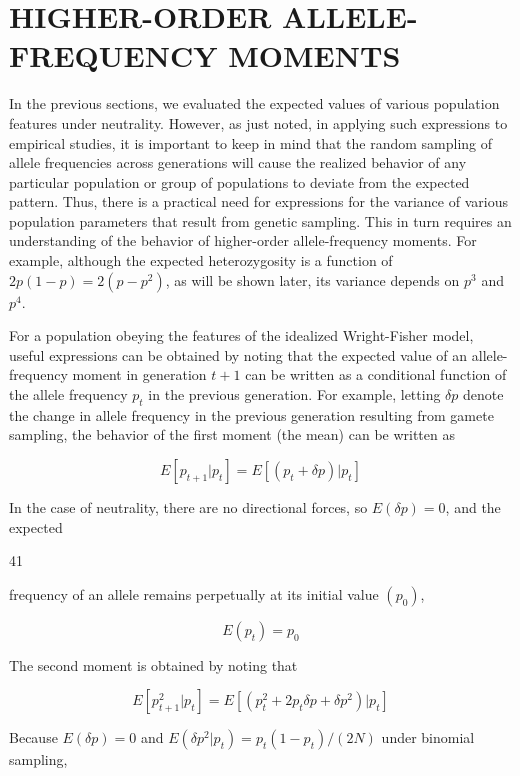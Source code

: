 \documentclass{article}
\begin{document}
\section{HIGHER-ORDER ALLELE-FREQUENCY MOMENTS}
In the previous sections, we evaluated the expected values of various population features under neutrality. However, as just noted, in applying such expressions to empirical studies, it is important to keep in mind that the random sampling of allele frequencies across generations will cause the realized behavior of any particular population or group of populations to deviate from the expected pattern. Thus, there is a practical need for expressions for the variance of various population parameters that result from genetic sampling. This in turn requires an understanding of the behavior of higher-order allele-frequency moments. For example, although the expected heterozygosity is a function of  $ 2p(1-p) = 2(p-p^2) $, as will be shown later, its variance depends on  $ p^3 $ and  $ p^4 $.

For a population obeying the features of the idealized Wright-Fisher model, useful expressions can be obtained by noting that the expected value of an allele-frequency moment in generation  $ t + 1 $ can be written as a conditional function of the allele frequency  $ p_t $ in the previous generation. For example, letting  $ \delta p $ denote the change in allele frequency in the previous generation resulting from gamete sampling, the behavior of the first moment (the mean) can be written as

\begin{equation}
E[p_{t+1}|p_{t}]=E[(p_{t}+\delta p)|p_{t}]
\end{equation}

In the case of neutrality, there are no directional forces, so  $ E(\delta p) = 0 $, and the expected

41

frequency of an allele remains perpetually at its initial value  $ (p_{0}) $,

\begin{equation}
E(p_{t})=p_{0}
\tag{2.15}
\label{eq:2_15}
\end{equation}

The second moment is obtained by noting that

\begin{equation}
E[p_{t+1}^{2}|p_{t}]=E[(p_{t}^{2}+2p_{t}\delta p+\delta p^{2})|p_{t}]
\end{equation}

Because  $ E(\delta p) = 0 $ and  $ E(\delta p^2 | p_t) = p_t(1 - p_t)/(2N) $ under binomial sampling,
\end{document}
